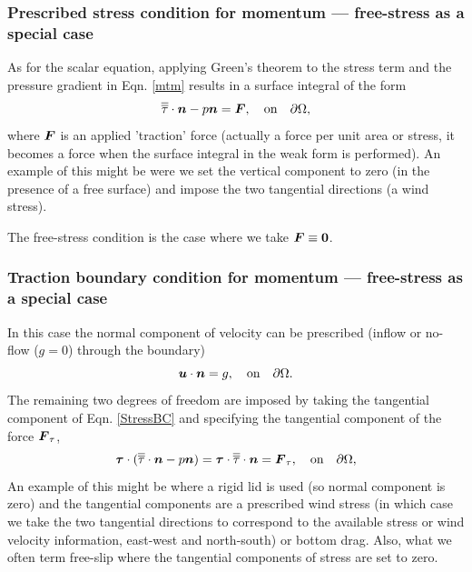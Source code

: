 
\subsubsection{Prescribed stress condition for momentum --- free-stress as a special case}\label{sect:bc_scalar_stress}
As for the scalar equation, applying Green's theorem to the stress term and the pressure gradient in Eqn. \ref{mtm} results in a surface integral of the form
\begin{equation}\label{StressBC}
\overline{\overline{\tau}}\cdot{\mbox{\boldmath$n$}} - p{\mbox{\boldmath$n$}} = {\mbox{\boldmath$F$}},\quad \textrm{on}\quad \partial\Omega,
\end{equation}
where ${\mbox{\boldmath$F$}}$ is an applied 'traction' force (actually a force per unit area or stress, it becomes a force when the surface integral in the weak form is performed). An example of this might be were we set the vertical component to zero (in the presence of a free surface) and impose the two tangential directions (\eg a wind stress).

The free-stress condition is the case where we take ${\mbox{\boldmath$F$}}\equiv{\mbox{\boldmath$0$}}$.


\subsubsection{Traction boundary condition for momentum --- free-stress as a special case}\label{sect:bc_scalar_traction}
In this case the normal component of velocity can be prescribed (\eg inflow or no-flow ($g=0$) through the boundary)
\begin{equation}
{\mbox{\boldmath$u$}}\cdot{\mbox{\boldmath$n$}} = g,\quad \textrm{on}\quad \partial\Omega.
\end{equation}
The remaining two degrees of freedom are imposed by taking the tangential component of Eqn. \ref{StressBC} and specifying the tangential component of the force ${\mbox{\boldmath$F$}}_{\tau}$, \ie
\begin{equation}
{\mbox{\boldmath$\tau$}}\cdot(\overline{\overline{\tau}}\cdot{\mbox{\boldmath$n$}} - p{\mbox{\boldmath$n$}}) = {\mbox{\boldmath$\tau$}}\cdot\overline{\overline{\tau}}\cdot{\mbox{\boldmath$n$}} = {\mbox{\boldmath$F$}}_{\tau},\quad \textrm{on}\quad \partial\Omega,
\end{equation}
An example of this might be where a rigid lid is used (so normal component is zero) and the tangential components are a prescribed wind stress (in which case we take the two tangential directions to correspond to the available stress or wind velocity information, \ie east-west and north-south) or bottom drag. Also, what we often term free-slip where the tangential components of stress are set to zero.


